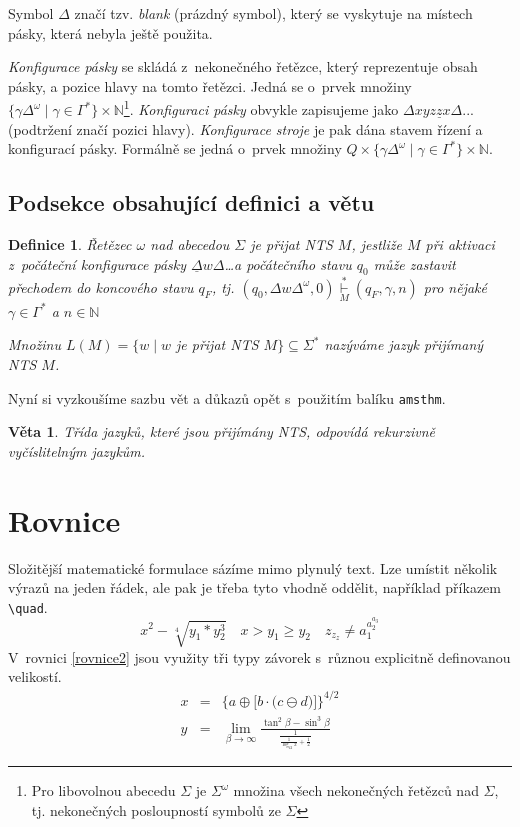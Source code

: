 \documentclass[11pt, a4paper, twocolumn]{article}
\newtheorem{definice}{Definice}
\newtheorem{veta}{Věta}
\begin{document}
Symbol $\Delta$ značí tzv. \emph{blank} (prázdný symbol), který se vyskytuje na místech pásky, která nebyla ještě použita.

\emph{Konfigurace pásky} se skládá z~nekonečného řetězce, který reprezentuje obsah pásky, a pozice hlavy na tomto řetězci. Jedná se o~prvek množiny $\{\gamma\Delta^\omega \mid \gamma \in \Gamma^*\} \times \mathbb{N}$\footnote{Pro libovolnou abecedu $\Sigma$ je $\Sigma^\omega$ množina všech nekonečných řetězců nad $\Sigma$, tj. nekonečných posloupností symbolů ze $\Sigma$}.
\emph{Konfiguraci pásky} obvykle zapisujeme jako $\Delta xyz\underline{z}x \Delta...$ (podtržení značí pozici hlavy).
\emph{Konfigurace stroje} je pak dána stavem řízení a konfigurací pásky. Formálně se jedná o~prvek množiny $Q \times \{\gamma\Delta^\omega \mid \gamma \in \Gamma^*\} \times \mathbb{N}$.

\subsection{Podsekce obsahující definici a větu}
\begin{definice}
\label{definice2}
\emph{Řetězec} $\omega$ \emph{nad abecedou} $\Sigma$ \emph{je přijat NTS} $M$, jestliže $M$ při aktivaci z~počáteční konfigurace pásky $\underline{\Delta}w\Delta$\dots a počátečního stavu $q_0$ může zastavit přechodem do koncového stavu $q_F$, tj. $(q_0,\Delta w\Delta^\omega,\mbox{0}) \stackrel{*}{\underset{M}{\vdash}} (q_F,\gamma,n)$ pro nějaké $\gamma \in \Gamma^*$ a $n \in \mathbb{N}$

Množinu $L(M) = \{w \mid w$ je přijat NTS $M\}\subseteq \Sigma^*$ nazýváme \emph{jazyk přijímaný NTS} $M$.
\end{definice}
Nyní si vyzkoušíme sazbu vět a důkazů opět s~použitím balíku \texttt{amsthm}.
\begin{veta}
Třída jazyků, které jsou přijímány NTS, odpovídá \emph{rekurzivně vyčíslitelným jazykům.}
\end{veta}

\section{Rovnice}

Složitější matematické formulace sázíme mimo plynulý text. Lze umístit několik výrazů na jeden řádek, ale pak je třeba tyto vhodně oddělit, například příkazem \verb|\quad|.
$$x^2-\sqrt[4]{y_1*y_2^3}\quad x>y_1\geq y_2\quad z_{z_z} \neq a_1^{a_2^{a_3}}$$
V~rovnici \eqref{rovnice2} jsou využity tři typy závorek s~různou explicitně definovanou velikostí.
\setcounter{equation}{0}
\begin{eqnarray}
    x & = & \bigg\{a\oplus \Big[b\cdot\big(c\ominus d\big)\Big]\bigg\}^{4/2} \\
    y & = & \lim\limits _{\beta \rightarrow \infty} \frac{\tan^2\beta-\sin^3\beta}{\frac{1}{\frac{1}{\log_{42}x}+\frac{1}{2}}} \label{rovnice2}
\end{eqnarray}
\end{document}
